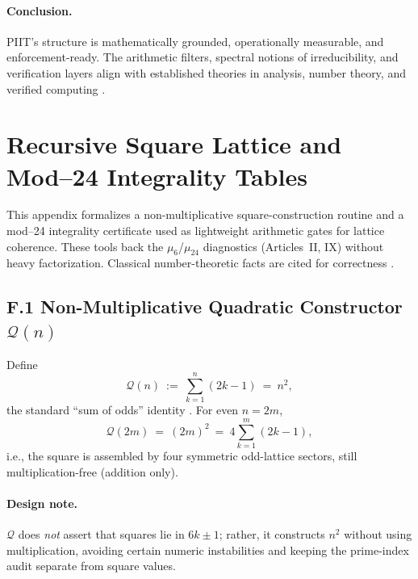\documentclass[12pt]{amsart}
\theoremstyle{plain}
\begin{document}
\paragraph{Conclusion.} PIIT’s structure is mathematically grounded, operationally measurable, and enforcement-ready. The arithmetic filters, spectral notions of irreducibility, and verification layers align with established theories in analysis, number theory, and verified computing \cite{hardy2008introduction,serre1973course,diamond2005first,iwaniec2002spectral,schneider2000enforceable,clarke1999model,baier2008model}.


\clearpage
\section{Recursive Square Lattice and Mod–24 Integrality Tables}

\noindent This appendix formalizes a non-multiplicative square-construction routine and a mod–24 integrality certificate used as lightweight arithmetic gates for lattice coherence. These tools back the $\mu_6$/$\mu_{24}$ diagnostics (Articles~II, IX) without heavy factorization. Classical number-theoretic facts are cited for correctness \cite{hardy2008introduction}.

\subsection*{F.1 Non-Multiplicative Quadratic Constructor $\mathcal{Q}(n)$}
Define
\begin{equation}
\mathcal{Q}(n)\ :=\ \sum_{k=1}^{n} (2k-1)\ =\ n^{2},
\label{eq:sum-of-odds}
\end{equation}
the standard “sum of odds” identity \cite[Ch.~1]{hardy2008introduction}. For even $n=2m$,
\begin{equation}
\mathcal{Q}(2m)\ =\ (2m)^{2}\ =\ 4\sum_{k=1}^{m}(2k-1),
\label{eq:even-repack}
\end{equation}
i.e., the square is assembled by four symmetric odd-lattice sectors, still multiplication-free (addition only). 
\paragraph{Design note.} $\mathcal{Q}$ does \emph{not} assert that squares lie in $6k\pm1$; rather, it constructs $n^{2}$ without using multiplication, avoiding certain numeric instabilities and keeping the prime-index audit separate from square values.
\end{document}
